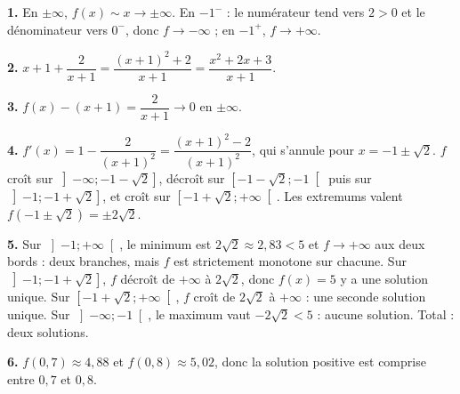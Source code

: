 \begin{corrige}
\textbf{1.} En $\pm\infty$, $f(x) \sim x \to \pm\infty$. En $-1^{-}$ :
le numérateur tend vers $2 > 0$ et le dénominateur vers $0^{-}$, donc
$f \to -\infty$ ; en $-1^{+}$, $f \to +\infty$.

\textbf{2.} $x + 1 + \dfrac{2}{x+1} = \dfrac{(x+1)^{2} + 2}{x+1}
= \dfrac{x^{2}+2x+3}{x+1}$.

\textbf{3.} $f(x) - (x+1) = \dfrac{2}{x+1} \to 0$ en $\pm\infty$.

\textbf{4.} $f'(x) = 1 - \dfrac{2}{(x+1)^{2}} = \dfrac{(x+1)^{2}-2}{(x+1)^{2}}$,
qui s'annule pour $x = -1 \pm \sqrt{2}$. $f$ croît sur
$\left]-\infty ; -1-\sqrt{2}\right]$, décroît sur
$\left[-1-\sqrt{2} ; -1\right[$ puis sur $\left]-1 ; -1+\sqrt{2}\right]$, et
croît sur $\left[-1+\sqrt{2} ; +\infty\right[$. Les extremums valent
$f(-1\pm\sqrt{2}) = \pm 2\sqrt{2}$.

\textbf{5.} Sur $\left]-1 ; +\infty\right[$, le minimum est $2\sqrt{2} \approx 2{,}83 < 5$
et $f \to +\infty$ aux deux bords : deux branches, mais $f$ est strictement
monotone sur chacune. Sur $\left]-1 ; -1+\sqrt{2}\right]$, $f$ décroît de
$+\infty$ à $2\sqrt{2}$, donc $f(x)=5$ y a une solution unique. Sur
$\left[-1+\sqrt{2} ; +\infty\right[$, $f$ croît de $2\sqrt{2}$ à $+\infty$ :
une seconde solution unique. Sur $\left]-\infty ; -1\right[$, le maximum vaut
$-2\sqrt{2} < 5$ : aucune solution. Total : deux solutions.

\textbf{6.} $f(0{,}7) \approx 4{,}88$ et $f(0{,}8) \approx 5{,}02$, donc la
solution positive est comprise entre $0{,}7$ et $0{,}8$.
\end{corrige}

